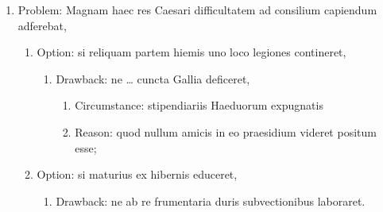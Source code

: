 \documentclass[12pt,letterpaper,oneside,final]{memoir}
\begin{document}
\begin{latin}
\begin{enumerate}
\item Problem: \textlatin{Magnam haec res Caesari difficultatem ad consilium capiendum adferebat,}
  \begin{enumerate}
  \item Option: \textlatin{si reliquam partem hiemis uno loco legiones contineret,}
    \begin{enumerate}
    \item Drawback: \textlatin{ne \ldots{} cuncta Gallia deficeret,}
      \begin{enumerate}
      \item Circumstance: \textlatin{stipendiariis Haeduorum expugnatis}
      \item Reason: \textlatin{quod nullum amicis in eo praesidium videret positum esse;}
      \end{enumerate}
    \end{enumerate}
  \item Option: \textlatin{si maturius ex hibernis educeret,}
    \begin{enumerate}
    \item Drawback: \textlatin{ne ab re frumentaria duris subvectionibus laboraret.}
    \end{enumerate}
  \end{enumerate}

\end{enumerate}
\end{latin}
\end{document}
